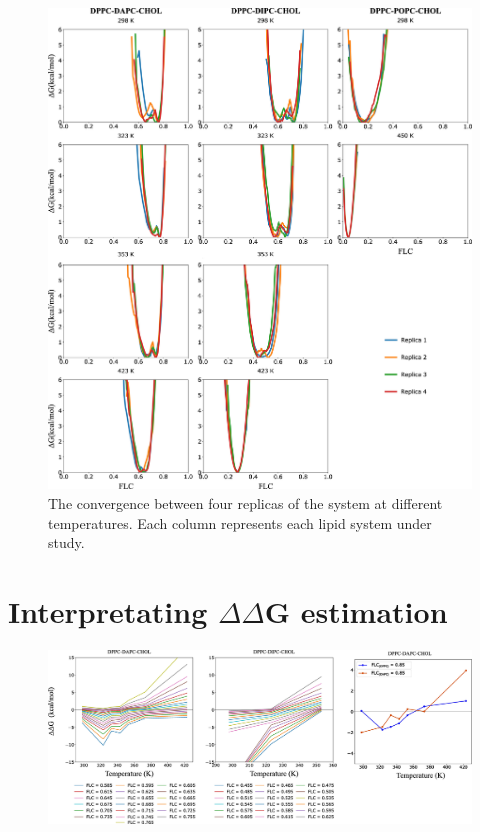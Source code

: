 \documentclass[10pt]{article}
\let\oldsection\section
\renewcommand{\section}{\clearpage\oldsection}
\begin{document}
\begin{figure}[H]
    \centering
    \includegraphics[width=6.5in]{Figures/Supplementary/ReplicaConvergence/placeholder.jpg}
    \caption{The convergence between four replicas of the system at different temperatures. Each column represents each lipid system under study.}
    \label{figs7:view}
\end{figure}

\section*{Interpretating $\Delta\Delta$G estimation}

\begin{figure}[H]
    \centering
    \includegraphics[width=6.5in]{Figures/Supplementary/InterpretingDelDelG/placeholder.jpg}
    \caption{}
    \label{figs8:view}
\end{figure}



\end{document}

